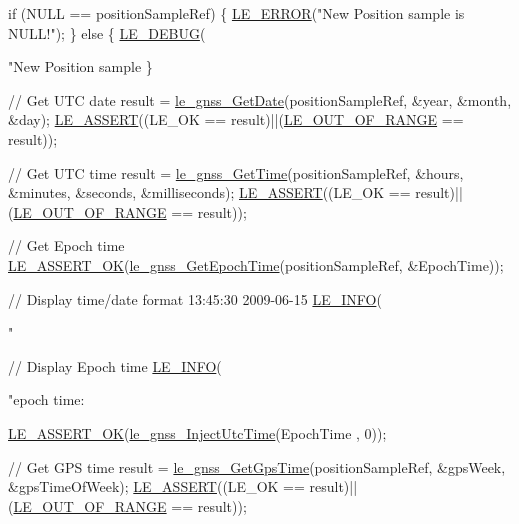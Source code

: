 \begin{DoxyCodeInclude}
{{{{    \textcolor{keywordflow}{if} (NULL == positionSampleRef)
    \{
        \hyperlink{le__log_8h_a353590f91b3143a7ba3a416ae5a50c3d}{LE\_ERROR}(\textcolor{stringliteral}{"New Position sample is NULL!"});
    \}
    \textcolor{keywordflow}{else}
    \{
        \hyperlink{le__log_8h_a2a91ea8857cf190fde71d85ba930a498}{LE\_DEBUG}(\textcolor{stringliteral}{"New Position sample %
    \}

    \textcolor{comment}{// Get UTC date}
    result = \hyperlink{le__gnss__interface_8h_a29602d1e12325d0076802af0db7f23ca}{le\_gnss\_GetDate}(positionSampleRef, &year, &month, &day);
    \hyperlink{le__log_8h_ac0dbbef91dc0fed449d0092ff0557b39}{LE\_ASSERT}((LE\_OK == result)||(\hyperlink{le__basics_8h_a1cca095ed6ebab24b57a636382a6c86caef8ecf11fa8556fd2d3ca8faab697717}{LE\_OUT\_OF\_RANGE} == result));

    \textcolor{comment}{// Get UTC time}
    result = \hyperlink{le__gnss__interface_8h_a0d014a96fc8b15b736d04747d51082d9}{le\_gnss\_GetTime}(positionSampleRef, &hours, &minutes, &seconds, &milliseconds);
    \hyperlink{le__log_8h_ac0dbbef91dc0fed449d0092ff0557b39}{LE\_ASSERT}((LE\_OK == result)||(\hyperlink{le__basics_8h_a1cca095ed6ebab24b57a636382a6c86caef8ecf11fa8556fd2d3ca8faab697717}{LE\_OUT\_OF\_RANGE} == result));

    \textcolor{comment}{// Get Epoch time}
    \hyperlink{le__log_8h_a7cd2daa3d4af1de4d29e0eed95187484}{LE\_ASSERT\_OK}(\hyperlink{le__gnss__interface_8h_a38c21e7f7f7da5481f67e118fb3ea89c}{le\_gnss\_GetEpochTime}(positionSampleRef, &EpochTime));

    \textcolor{comment}{// Display time/date format 13:45:30 2009-06-15}
    \hyperlink{le__log_8h_a23e6d206faa64f612045d688cdde5808}{LE\_INFO}(\textcolor{stringliteral}{"%

    \textcolor{comment}{// Display Epoch time}
    \hyperlink{le__log_8h_a23e6d206faa64f612045d688cdde5808}{LE\_INFO}(\textcolor{stringliteral}{"epoch time: %

    \hyperlink{le__log_8h_a7cd2daa3d4af1de4d29e0eed95187484}{LE\_ASSERT\_OK}(\hyperlink{le__gnss__interface_8h_ab058224c242c97d458fcc8ad03b1f1c9}{le\_gnss\_InjectUtcTime}(EpochTime , 0));

    \textcolor{comment}{// Get GPS time}
    result = \hyperlink{le__gnss__interface_8h_a4e9966df8185978aaef75399d5aff2d3}{le\_gnss\_GetGpsTime}(positionSampleRef, &gpsWeek, &gpsTimeOfWeek);
    \hyperlink{le__log_8h_ac0dbbef91dc0fed449d0092ff0557b39}{LE\_ASSERT}((LE\_OK == result)||(\hyperlink{le__basics_8h_a1cca095ed6ebab24b57a636382a6c86caef8ecf11fa8556fd2d3ca8faab697717}{LE\_OUT\_OF\_RANGE} == result));

}}}}}}}
\end{DoxyCodeInclude}
